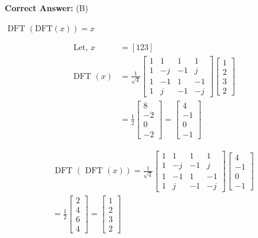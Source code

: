 \documentclass[11pt,a4paper]{article}
\begin{document}
\noindent \textbf{Correct Answer:} (B)

\begin{tcolorbox}[solbox, title=Detailed Solution -- Question 112]
$\text { DFT }(\text{DFT}(x))=x$

\[
\begin{aligned} \text { Let, } x &=[123] \\ \text { DFT }(x) &=\frac{1}{\sqrt{4}}\left[\begin{array}{cccc}1 & 1 & 1 & 1 \\ 1 & -j & -1 & j \\ 1 & -1 & 1 & -1 \\ 1 & j & -1 & -j\end{array}\right]\left[\begin{array}{l}1 \\ 2 \\ 3 \\ 2\end{array}\right] \\ &=\frac{1}{2}\left[\begin{array}{r}8 \\ -2 \\ 0 \\ -2\end{array}\right]=\left[\begin{array}{r}4 \\ -1 \\ 0 \\ -1\end{array}\right] \end{aligned}
\]

\[
\begin{array}{l} \text { DFT } (\text { DFT }(x))=\frac{1}{\sqrt{4}}\left[\begin{array}{cccc} 1 & 1 & 1 & 1 \\ 1 & -j & -1 & j \\ 1 & -1 & 1 & -1 \\ 1 & j & -1 & -j \end{array}\right]\left[\begin{array}{c} 4 \\ -1 \\ 0 \\ -1 \end{array}\right] \\ =\frac{1}{2}\left[\begin{array}{l} 2 \\ 4 \\ 6 \\ 4 \end{array}\right]=\left[\begin{array}{l} 1 \\ 2 \\ 3 \\ 2 \end{array}\right] \end{array}
\]
\end{tcolorbox}
\end{document}
